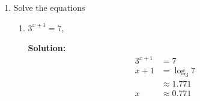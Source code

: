 \documentclass{report}
\newcommand{\sol}{\vspace{0.2cm}\textbf{Solution:}\vspace{0.2cm}}
\begin{document}
\begin{multicols*}{2}
\begin{enumerate}[leftmargin=*]
\begin{enumerate}[label=(\roman*)]
                  \item $\log _{y} 8=\frac{1}{3}$

                        \sol{}
                        \begin{align*}
                            \log_y 8        & = \dfrac{1}{3} \\
                            y^{\frac{1}{3}} & = 8            \\
                            y               & = 8^3          \\
                                            & = 512
                        \end{align*}

                  \item $z + \sqrt{32 - z} = 2$.

                        \sol{}
                        \begin{align*}
                            z + \sqrt{32 - z} & = 2                \\
                            \sqrt{32 - z}     & = 2 - z            \\
                            32 - z            & = 4 - 4z + z^2     \\
                            z^2 - 3z - 28     & = 0                \\
                            (z - 7)(z + 4)    & = 0                \\
                            z                 & = 7 \text{ or } -4
                        \end{align*}

              \end{enumerate}

        \item Solve the equations
              \begin{enumerate}[label=(\roman*)]
                  \item $3^{x+1}=7$,

                        \sol{}
                        \begin{align*}
                            3^{x+1} & = 7           \\
                            x + 1   & = \log_3 7    \\
                                    & \approx 1.771 \\
                            x       & \approx 0.771
                        \end{align*}


\end{enumerate}
\end{enumerate}
\end{multicols*}
\end{document}
